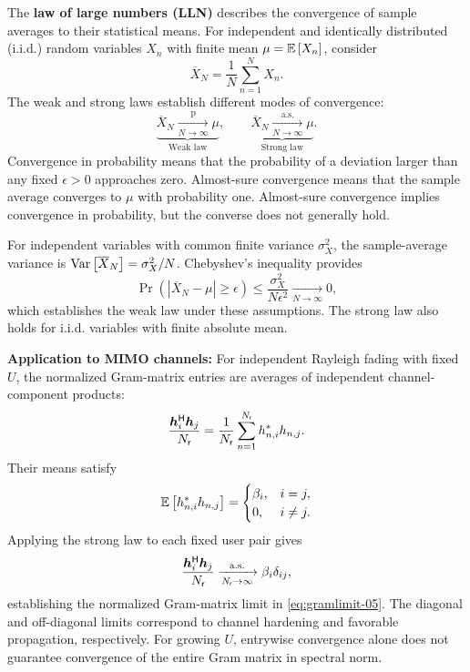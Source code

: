 The \textbf{law of large numbers (LLN)} describes the convergence of sample averages to their statistical means. For independent and identically distributed (i.i.d.) random variables $X_n$ with finite mean $\mu=\mathbb{E}\left[X_n\right]$, consider
\begin{equation*}
	\overline X_N=\frac{1}{N}\sum_{n=1}^{N}X_n.
\end{equation*}
The weak and strong laws establish different modes of convergence:
\begin{equation}
	\boxed{
		\underbrace{\overline X_N\xrightarrow[N\to\infty]{\mathrm p}\mu}_{\text{Weak law}},
		\qquad
		\underbrace{\overline X_N\xrightarrow[N\to\infty]{\mathrm{a.s.}}\mu}_{\text{Strong law}}.
	}
	\label{eq:lln-05}
\end{equation}
Convergence in probability means that the probability of a deviation larger than any fixed $\epsilon>0$ approaches zero. Almost-sure convergence means that the sample average converges to $\mu$ with probability one. Almost-sure convergence implies convergence in probability, but the converse does not generally hold.

For independent variables with common finite variance $\sigma_X^2$, the sample-average variance is $\operatorname{Var}\left[\overline X_N\right]=\sigma_X^2/N$. Chebyshev's inequality provides
\begin{equation}
	\Pr\left(|\overline X_N-\mu|\geq\epsilon\right)
	\leq\frac{\sigma_X^2}{N\epsilon^2}
	\xrightarrow[N\to\infty]{}0,
	\label{eq:llnchebyshev-05}
\end{equation}
which establishes the weak law under these assumptions. The strong law also holds for i.i.d. variables with finite absolute mean.

\textbf{Application to MIMO channels:} For independent Rayleigh fading with fixed $U$, the normalized Gram-matrix entries are averages of independent channel-component products:
\begin{equation}
	\frac{{\bm{h}}^{\mathsf{H}}_i\bm{h}_j}{N_{\mathsf{r}}}
	=\frac{1}{N_{\mathsf{r}}}\sum_{n=1}^{N_{\mathsf{r}}}h_{n,i}^*h_{n,j}.
\end{equation}
Their means satisfy
\begin{equation*}
	\mathbb{E}\left[h_{n,i}^*h_{n,j}\right]
	=\begin{cases}
		\beta_i, & i=j,\\
		0, & i\ne j.
	\end{cases}
\end{equation*}
Applying the strong law to each fixed user pair gives
\begin{equation}
	\frac{{\bm{h}}^{\mathsf{H}}_i\bm{h}_j}{N_{\mathsf{r}}}
	\xrightarrow[N_{\mathsf{r}}\to\infty]{\mathrm{a.s.}}
	\beta_i\delta_{ij},
	\label{eq:llngram-05}
\end{equation}
establishing the normalized Gram-matrix limit in \eqref{eq:gramlimit-05}. The diagonal and off-diagonal limits correspond to channel hardening and favorable propagation, respectively. For growing $U$, entrywise convergence alone does not guarantee convergence of the entire Gram matrix in spectral norm.


